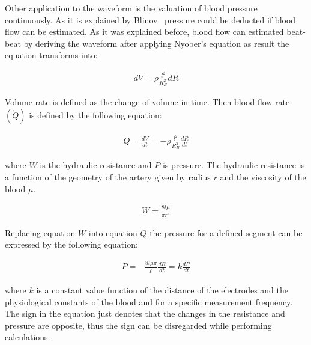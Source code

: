 Other application to the waveform is the valuation of blood pressure continuously. As it is explained by Blinov~\cite{blinov1997plethysmographic} pressure could be deducted if blood flow can be estimated. As it was explained before, blood flow can estimated beat-beat by deriving the waveform after applying Nyober's equation as result the equation transforms into:

\begin{align}
\label{eq:dvdr}
dV = \rho \frac{l^2}{R^2_B} dR
\end{align}

Volume rate is defined as the change of volume in time. Then blood flow rate $(\dot{Q})$ is defined by the following equation:

\begin{align}
\dot{Q} = \frac{dV}{dt}=-\rho \frac{l^2}{R^{2}_{B}} \frac{dR}{dt}
\end{align}

where $W$ is the hydraulic resistance and $P$ is pressure. The hydraulic resistance is a function of the geometry of the artery given by radius $r$ and the viscosity of the blood $\mu$.

\begin{align}
W=\frac{8 l \mu}{\pi r^4}
\end{align}

Replacing equation $W$ into equation $\dot{Q}$ the pressure for a defined segment can be expressed by the following equation:

\begin{align}
P = -\frac{8 l \mu \pi}{\rho} \frac{dR}{dt} = k \frac{dR}{dt}
\end{align}

where $k$ is a constant value function of the distance of the electrodes  and the physiological constants of the blood and for a specific measurement frequency. The sign in the equation just denotes that the changes in the resistance and pressure are opposite, thus the sign can be disregarded while performing calculations.

